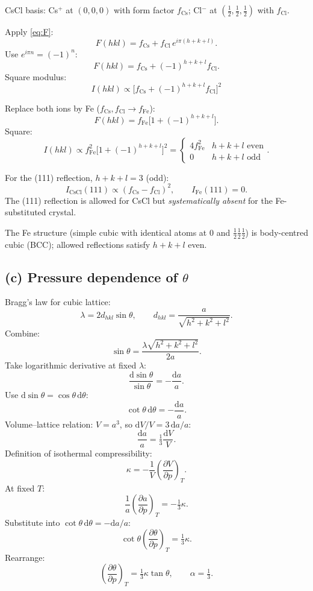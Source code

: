 \documentclass[11pt]{article}
\newcommand{\de}{\mathrm{d}}
\newcommand{\pd}[2]{\frac{\partial #1}{\partial #2}}
\begin{document}
CsCl basis: Cs$^+$ at $(0,0,0)$ with form factor $f_\text{Cs}$; Cl$^-$ at $(\tfrac12,\tfrac12,\tfrac12)$ with $f_\text{Cl}$.

Apply \eqref{eq:F}:
\[
F(hkl) = f_\text{Cs} + f_\text{Cl}\,e^{i\pi(h+k+l)}.
\]
Use $e^{i\pi n} = (-1)^n$:
\[
F(hkl) = f_\text{Cs} + (-1)^{h+k+l}f_\text{Cl}.
\]
Square modulus:
\begin{equation}
\boxed{\;I(hkl) \propto \bigl[f_\text{Cs} + (-1)^{h+k+l}f_\text{Cl}\bigr]^2\;}
\end{equation}

Replace both ions by Fe ($f_\text{Cs},f_\text{Cl}\to f_\text{Fe}$):
\[
F(hkl) = f_\text{Fe}\bigl[1+(-1)^{h+k+l}\bigr].
\]
Square:
\[
I(hkl) \propto f_\text{Fe}^2\bigl[1+(-1)^{h+k+l}\bigr]^2 = \begin{cases} 4f_\text{Fe}^2 & h+k+l \text{ even}\\ 0 & h+k+l \text{ odd}\end{cases}.
\]

For the (111) reflection, $h+k+l=3$ (odd):
\[
I_\text{CsCl}(111) \propto (f_\text{Cs}-f_\text{Cl})^2,\qquad I_\text{Fe}(111) = 0.
\]
The (111) reflection is allowed for CsCl but \emph{systematically absent} for the Fe-substituted crystal.

The Fe structure (simple cubic with identical atoms at $0$ and $\tfrac12\tfrac12\tfrac12$) is body-centred cubic (BCC); allowed reflections satisfy $h+k+l$ even.

\subsection*{(c) Pressure dependence of $\theta$}

Bragg's law for cubic lattice:
\begin{equation}
\lambda = 2d_{hkl}\sin\theta,\qquad d_{hkl} = \frac{a}{\sqrt{h^2+k^2+l^2}}.
\label{eq:Bragg}
\end{equation}
Combine:
\[
\sin\theta = \frac{\lambda\sqrt{h^2+k^2+l^2}}{2a}.
\]
Take logarithmic derivative at fixed $\lambda$:
\[
\frac{\de\sin\theta}{\sin\theta} = -\frac{\de a}{a}.
\]
Use $\de\sin\theta = \cos\theta\,\de\theta$:
\[
\cot\theta\,\de\theta = -\frac{\de a}{a}.
\]
Volume--lattice relation: $V = a^3$, so $\de V/V = 3\,\de a/a$:
\[
\frac{\de a}{a} = \tfrac{1}{3}\frac{\de V}{V}.
\]
Definition of isothermal compressibility:
\[
\kappa = -\frac{1}{V}\!\left(\pd{V}{p}\right)_T.
\]
At fixed $T$:
\[
\frac{1}{a}\!\left(\pd{a}{p}\right)_T = -\tfrac{1}{3}\kappa.
\]
Substitute into $\cot\theta\,\de\theta = -\de a/a$:
\[
\cot\theta\!\left(\pd{\theta}{p}\right)_T = \tfrac{1}{3}\kappa.
\]
Rearrange:
\begin{equation}
\boxed{\;\!\left(\pd{\theta}{p}\right)_T = \tfrac{1}{3}\kappa\tan\theta,\qquad \alpha = \tfrac{1}{3}.\;}
\end{equation}
\end{document}
